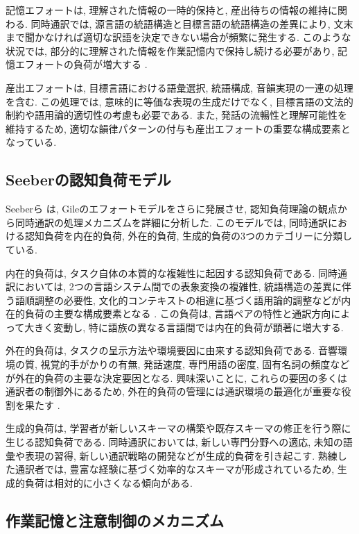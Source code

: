 記憶エフォートは, 理解された情報の一時的保持と, 産出待ちの情報の維持に関わる.
同時通訳では, 源言語の統語構造と目標言語の統語構造の差異により, 文末まで聞かなければ適切な訳語を決定できない場合が頻繁に発生する.
このような状況では, 部分的に理解された情報を作業記憶内で保持し続ける必要があり, 記憶エフォートの負荷が増大する \cite{darò1994memory}.

産出エフォートは, 目標言語における語彙選択, 統語構成, 音韻実現の一連の処理を含む.
この処理では, 意味的に等価な表現の生成だけでなく, 目標言語の文法的制約や語用論的適切性の考慮も必要である.
また, 発話の流暢性と理解可能性を維持するため, 適切な韻律パターンの付与も産出エフォートの重要な構成要素となっている.

\subsection{Seeberの認知負荷モデル}

Seeberら \cite{seeber2011cognitive, seeber2013cognitive} は, Gileのエフォートモデルをさらに発展させ, 認知負荷理論の観点から同時通訳の処理メカニズムを詳細に分析した.
このモデルでは, 同時通訳における認知負荷を内在的負荷, 外在的負荷, 生成的負荷の3つのカテゴリーに分類している.

内在的負荷は, タスク自体の本質的な複雑性に起因する認知負荷である.
同時通訳においては, 2つの言語システム間での表象変換の複雑性, 統語構造の差異に伴う語順調整の必要性, 文化的コンテキストの相違に基づく語用論的調整などが内在的負荷の主要な構成要素となる \cite{seeber2011cognitive}.
この負荷は, 言語ペアの特性と通訳方向によって大きく変動し, 特に語族の異なる言語間では内在的負荷が顕著に増大する.

外在的負荷は, タスクの呈示方法や環境要因に由来する認知負荷である.
音響環境の質, 視覚的手がかりの有無, 発話速度, 専門用語の密度, 固有名詞の頻度などが外在的負荷の主要な決定要因となる.
興味深いことに, これらの要因の多くは通訳者の制御外にあるため, 外在的負荷の管理には通訳環境の最適化が重要な役割を果たす \cite{kurz2001conference}.

生成的負荷は, 学習者が新しいスキーマの構築や既存スキーマの修正を行う際に生じる認知負荷である.
同時通訳においては, 新しい専門分野への適応, 未知の語彙や表現の習得, 新しい通訳戦略の開発などが生成的負荷を引き起こす.
熟練した通訳者では, 豊富な経験に基づく効率的なスキーマが形成されているため, 生成的負荷は相対的に小さくなる傾向がある.

\subsection{作業記憶と注意制御のメカニズム}

